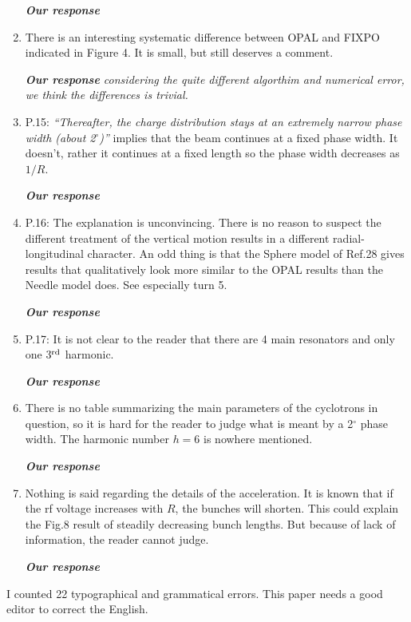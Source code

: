 \documentclass[10pt]{report}
\begin{document}
\begin{enumerate}
 \vspace{+2mm}
 {\it {\bf Our response}  
 }
 \vspace{+2mm}
 
  \item There is an interesting systematic difference between OPAL and FIXPO
 indicated in 
 Figure 4. It is small, but still deserves a comment.


 \vspace{+2mm}
 {\it {\bf Our response} considering the quite different algorthim and numerical error, 
   we think the differences is trivial. 
 }
 \vspace{+2mm}
  

  \item P.15: \textit{``Thereafter, the charge distribution stays at an
 extremely narrow 
 phase width (about 2$^\circ$)''} implies that the beam continues at a fixed
 phase width. It doesn't, rather it continues at a fixed length so the phase
 width decreases as $1/R$.


 \vspace{+2mm}
 {\it {\bf Our response}  
 }
 \vspace{+2mm}
 
 \item P.16: The explanation is unconvincing. There is no reason to suspect the
 different treatment of the vertical motion results in a different
 radial-longitudinal character. An odd thing is that the Sphere model of Ref.28
 gives results that qualitatively look more similar to the OPAL results than the
 Needle model does. See especially turn 5.


 \vspace{+2mm}
 {\it {\bf Our response}  
 }
 \vspace{+2mm}

 \item P.17: It is not clear to the reader that there are 4 main resonators and
 only one 3$^{\rm rd}$ harmonic.


 \vspace{+2mm}
 {\it {\bf Our response}  
 }
 \vspace{+2mm}
 
 \item There is no table summarizing the main parameters of the cyclotrons in
 question, so it is hard for the reader to judge what is meant by a 2$^\circ$
 phase width. The harmonic number $h=6$ is nowhere mentioned.


 \vspace{+2mm}
 {\it {\bf Our response}  
 }
 \vspace{+2mm}

 \item Nothing is said regarding the details of the acceleration. It is known
 that if the rf voltage increases with $R$, the bunches will shorten. This could
 explain the Fig.8 result of steadily decreasing bunch lengths. But because of
 lack of information, the reader cannot judge.


 \vspace{+2mm}
 {\it {\bf Our response}  
 }
 \vspace{+2mm}
 
 \end{enumerate}
 
 I counted 22 typographical and grammatical errors. This paper needs a good
 editor to correct the English.
 
\end{document}
